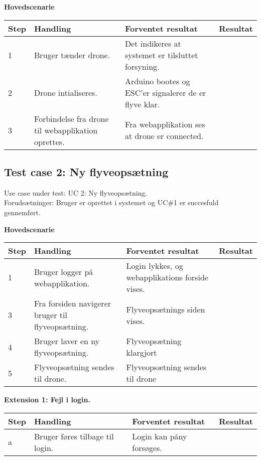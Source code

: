 \textbf{Hovedscenarie}
\begin{table}[H]
	\centering
		\begin{tabular}{|l|p{5 cm}|p{5 cm}|p{3.5 cm}|} 
		\hline
			Step & Handling & Forventet resultat & Resultat\\ \hline
			1 & Bruger tænder drone. & Det indikeres at systemet er tilsluttet forsyning. &   \\ \hline
			2 & Drone intialiseres. & Arduino bootes og ESC'er signalerer de er flyve klar. &   \\ \hline
			3 & Forbindelse fra drone til webapplikation oprettes. & Fra webapplikation ses at drone er connected. &  \\ \hline
		\end{tabular}
\end{table}


\subsection*{Test case 2: Ny flyveopsætning}
Use case under test: UC 2: Ny flyveopsætning.\\
Forudsætninger:	Bruger er oprettet i systemet og UC\#1 er succesfuld gennemført.

\textbf{Hovedscenarie}
\begin{table}[H]
	\centering
		\begin{tabular}{|l|p{5 cm}|p{5 cm}|p{3.5 cm}|} 
		\hline
			Step & Handling & Forventet resultat & Resultat\\ \hline
			1 & Bruger logger på webapplikation. & Login lykkes, og webapplikations forside vises. &  \\ \hline
			3 & Fra forsiden navigerer bruger til flyveopsætning. & Flyveopsætnings siden vises. & \\ \hline
			4 & Bruger laver en ny flyveopsætning. & Flyveopsætning klargjort & \\ \hline
			5 & Flyveopsætning sendes til drone. & Flyveopsætning sendes til drone & \\ \hline
		\end{tabular}
\end{table}

\textbf{Extension 1: Fejl i login.}
\begin{table}[H]
	\centering
		\begin{tabular}{|l|p{5 cm}|p{5 cm}|p{3.5 cm}|} 
		\hline
			Step & Handling & Forventet resultat & Resultat\\ \hline
			a & Bruger føres tilbage til login. & Login kan påny forsøges. & \\ \hline
		\end{tabular}
\end{table}

